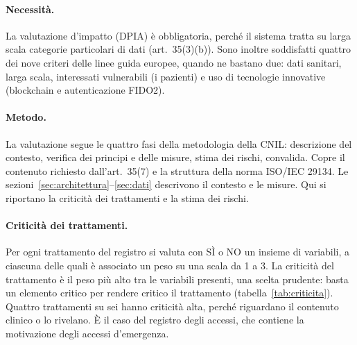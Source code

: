 \paragraph{Necessità.} La valutazione d'impatto (DPIA) è obbligatoria, perché il sistema tratta su larga scala categorie particolari di dati (art.~35(3)(b)). Sono inoltre soddisfatti quattro dei nove criteri delle linee guida europee\cite{wp248}, quando ne bastano due: dati sanitari, larga scala, interessati vulnerabili (i pazienti) e uso di tecnologie innovative (blockchain e autenticazione FIDO2).

\paragraph{Metodo.} La valutazione segue le quattro fasi della metodologia della CNIL\cite{cnil-pia}: descrizione del contesto, verifica dei principi e delle misure, stima dei rischi, convalida. Copre il contenuto richiesto dall'art.~35(7) e la struttura della norma ISO/IEC 29134\cite{iso29134}. Le sezioni~\ref{sec:architettura}--\ref{sec:dati} descrivono il contesto e le misure. Qui si riportano la criticità dei trattamenti e la stima dei rischi.

\paragraph{Criticità dei trattamenti.} Per ogni trattamento del registro si valuta con SÌ o NO un insieme di variabili, a ciascuna delle quali è associato un peso su una scala da 1 a 3. La criticità del trattamento è il peso più alto tra le variabili presenti, una scelta prudente: basta un elemento critico per rendere critico il trattamento (tabella~\ref{tab:criticita}). Quattro trattamenti su sei hanno criticità alta, perché riguardano il contenuto clinico o lo rivelano. È il caso del registro degli accessi, che contiene la motivazione degli accessi d'emergenza.

